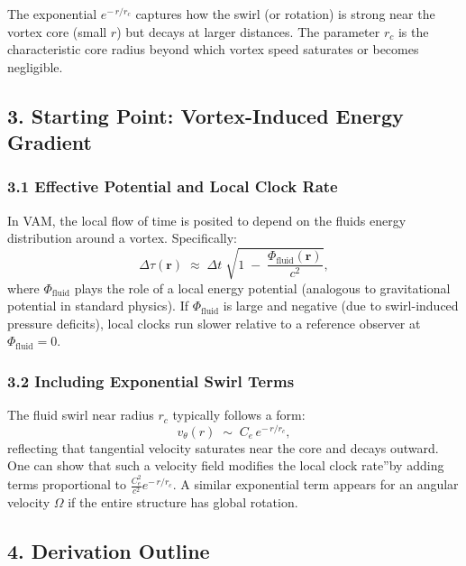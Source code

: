 The exponential \(e^{-\,r/r_c}\) captures how the swirl (or rotation) is strong near the vortex core (small \(r\)) but decays at larger distances. The parameter \(r_c\) is the characteristic core radius beyond which vortex speed saturates or becomes negligible.

\subsection*{3. Starting Point: Vortex-Induced Energy Gradient}

\subsubsection*{3.1 Effective Potential and Local Clock Rate}

In VAM, the local flow of time is posited to depend on the fluid\rqs s energy distribution around a vortex. Specifically:
\[
    \Delta \tau(\mathbf{r})
    \;\approx\;
    \Delta t
    \;\sqrt{
        1
        \;-\;
        \frac{\Phi_{\mathrm{fluid}}(\mathbf{r})}{c^2}
    },
\]
where \(\Phi_{\mathrm{fluid}}\) plays the role of a local energy potential (analogous to gravitational potential in standard physics). If \(\Phi_{\mathrm{fluid}}\) is large and negative (due to swirl-induced pressure deficits), local clocks run slower relative to a reference observer at \(\Phi_{\mathrm{fluid}}=0\).

\subsubsection*{3.2 Including Exponential Swirl Terms}

The fluid swirl near radius \(r_c\) typically follows a form:
\[
    v_{\theta}(r)
    \;\sim\;
    C_e \,e^{-\,r/r_c},
\]
reflecting that tangential velocity saturates near the core and decays outward. One can show that such a velocity field modifies the local \grqq clock rate\textquotedblright by adding terms proportional to \(\tfrac{C_e^2}{c^2} e^{-\,r/r_c}\). A similar exponential term appears for an angular velocity \(\Omega\) if the entire structure has global rotation.

\subsection*{4. Derivation Outline}

